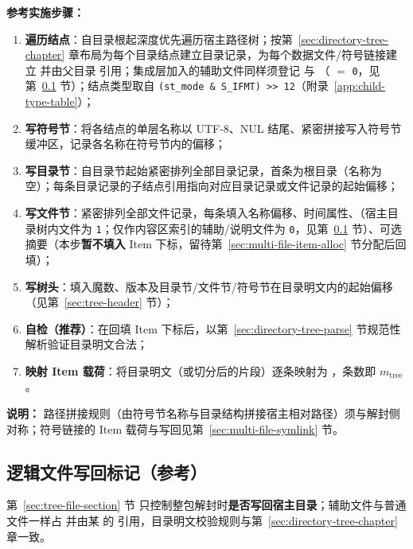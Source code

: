 \textbf{参考实施步骤：}
\begin{enumerate}
  \item \textbf{遍历结点}：自目录根起深度优先遍历宿主路径树；按第~\ref{sec:directory-tree-chapter} 章布局为每个目录结点建立目录记录，为每个数据文件/符号链接建立  并由父目录  引用；集成层加入的辅助文件同样须登记  与 （ $=$ \texttt{0}，见第~\ref{sec:multi-file-restore-flag} 节）；结点类型取自 \texttt{(st\_mode \& S\_IFMT) >> 12}（附录~\ref{app:child-type-table}）；
  \item \textbf{写符号节}：将各结点的单层名称以 UTF-8、NUL 结尾、紧密拼接写入符号节缓冲区，记录各名称在符号节内的偏移；
  \item \textbf{写目录节}：自目录节起始紧密排列全部目录记录，首条为根目录（名称为空）；每条目录记录的子结点引用指向对应目录记录或文件记录的起始偏移；
  \item \textbf{写文件节}：紧密排列全部文件记录，每条填入名称偏移、时间属性、（宿主目录树内文件为 \texttt{1}；仅作内容区索引的辅助/说明文件为 \texttt{0}，见第~\ref{sec:multi-file-restore-flag} 节）、可选摘要（本步\textbf{暂不填入} Item 下标，留待第~\ref{sec:multi-file-item-alloc} 节分配后回填）；
  \item \textbf{写树头}：填入魔数、版本及目录节/文件节/符号节在目录明文内的起始偏移（见第~\ref{sec:tree-header} 节）；
  \item \textbf{自检（推荐）}：在回填 Item 下标后，以第~\ref{sec:directory-tree-parse} 节规范性解析验证目录明文合法；
  \item \textbf{映射 Item 载荷}：将目录明文（或切分后的片段）逐条映射为 ，条数即 $m_{\mathrm{tree}}$。
\end{enumerate}

\textbf{说明：}
路径拼接规则（由符号节名称与目录结构拼接宿主相对路径）须与解封侧对称；符号链接的 Item 载荷与写回见第~\ref{sec:multi-file-symlink} 节。

\subsection{逻辑文件写回标记（参考）}\label{sec:multi-file-restore-flag}

第~\ref{sec:tree-file-section} 节  只控制整包解封时\textbf{是否写回宿主目录}；辅助文件与普通文件一样占  并由某  的  引用，目录明文校验规则与第~\ref{sec:directory-tree-chapter} 章一致。

